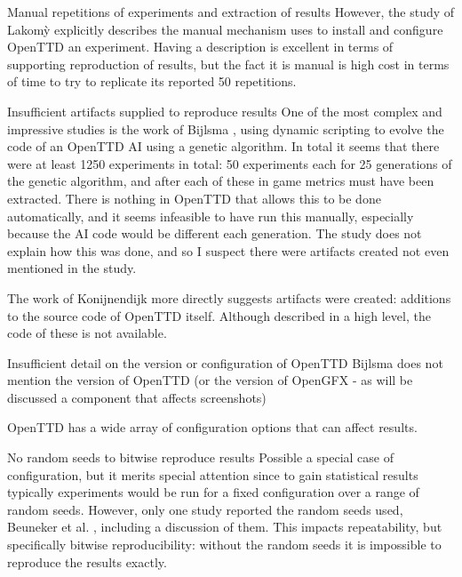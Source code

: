 \documentclass[logo,msc,dsti]{style/infthesis}    %
\begin{document}
{\begin{enumerate}
\begin{descitem}{Manual repetitions of experiments and extraction of results}
However, the study of {Lakom{\`y}} \cite{lakomy2020railroad} explicitly describes the manual mechanism uses to install and configure OpenTTD an experiment. Having a description is excellent in terms of supporting reproduction of results, but the fact it is manual is high cost in terms of time to try to replicate its reported 50 repetitions.
\end{descitem}
\begin{descitem}{Insufficient artifacts supplied to reproduce results}
One of the most complex and impressive studies is the work of Bijlsma \cite{bijlsma2014evolving}, using dynamic scripting to evolve the code of an OpenTTD AI using a genetic algorithm. In total it seems that there were at least 1250 experiments in total: 50 experiments each for 25 generations of the genetic algorithm, and after each of these in game metrics must have been extracted. There is nothing in OpenTTD that allows this to be done automatically, and it seems infeasible to have run this manually, especially because the AI code would be different each generation. The study does not explain how this was done, and so I suspect there were artifacts created not even mentioned in the study.

The work of Konijnendijk \cite{konijnendijk2015mcts} more directly suggests artifacts were created: additions to the source code of OpenTTD itself. Although described in a high level, the code of these is not available.
\end{descitem}

\begin{descitem}{Insufficient detail on the version or configuration of OpenTTD}
Bijlsma \cite{bijlsma2014evolving} does not mention the version of OpenTTD (or the version of OpenGFX - as will be discussed a component that affects screenshots)

OpenTTD has a wide array of configuration options that can affect results.
\end{descitem}
\begin{descitem}{No random seeds to bitwise reproduce results}
Possible a special case of configuration, but it merits special attention since to gain statistical results typically experiments would be run for a fixed configuration over a range of random seeds. However, only one study reported the random seeds used, Beuneker et al. \cite{beuneker2019autonomous}, including a discussion of them. This impacts repeatability, but specifically bitwise reproducibility: without the random seeds it is impossible to reproduce the results exactly.
\end{descitem}


\end{enumerate}}
\end{document}
